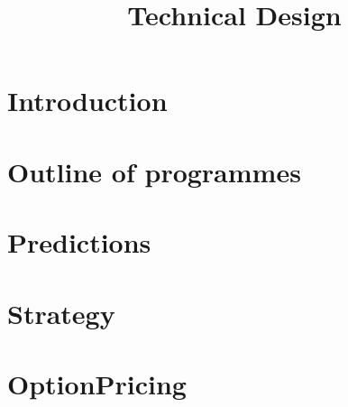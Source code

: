 \documentclass[12pt,a4paper,titlepage]{article}
\title {Technical Design}
\begin{document}
\maketitle
\section{Introduction}


\section{Outline of programmes}

\section{\FeedName}


\section{Predictions}
\section{Strategy}
\section{OptionPricing}
%
\end{document}
